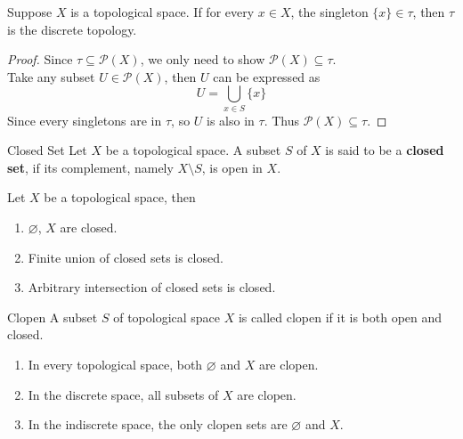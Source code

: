 \begin{proposition}{}{}
    Suppose $X$ is a topological space. If for every $x \in X$, the
    singleton $\{x\} \in \tau$, then $\tau$ is the
    discrete topology.
\end{proposition}

\begin{proof}
    Since $\tau \subseteq \mathcal{P}(X) $, we only need to show
    $\mathcal{P}(X) \subseteq \tau $.\\
    Take any subset $U \in \mathcal{P}(X) $, then $U$ can be expressed as
    \begin{equation}
        U = \bigcup_{x \in S} \{x\}
    \end{equation}
    Since every singletons are in $\tau$, so $U$ is also in $\tau$.
    Thus $\mathcal{P}(X) \subseteq \tau$.
\end{proof}

\begin{definition}{Closed Set}{}
    Let $X$ be a topological space. A subset $S$ of $X$ is said to be
    a \textbf{closed set}, if its complement, namely $X \setminus S$,
    is open in $X$.
\end{definition}

\begin{proposition}{}{}
    Let $X$ be a topological space, then
    \begin{enumerate}

        \item $\varnothing$, $X$ are closed.
        \item Finite union of closed sets is closed.
        \item Arbitrary intersection of closed sets is closed.

    \end{enumerate}
\end{proposition}

\begin{definition}{Clopen}{}
    A subset $S$ of topological space $X$ is called clopen if it is
    both open and closed.
\end{definition}

\begin{remarks}
    \begin{enumerate}

        \item In every topological space, both $\varnothing$ and
            $X$ are clopen.
        \item In the discrete space, all subsets of $X$ are clopen.
        \item In the indiscrete space, the only clopen sets are
            $\varnothing$ and $X$.

    \end{enumerate}
\end{remarks}

